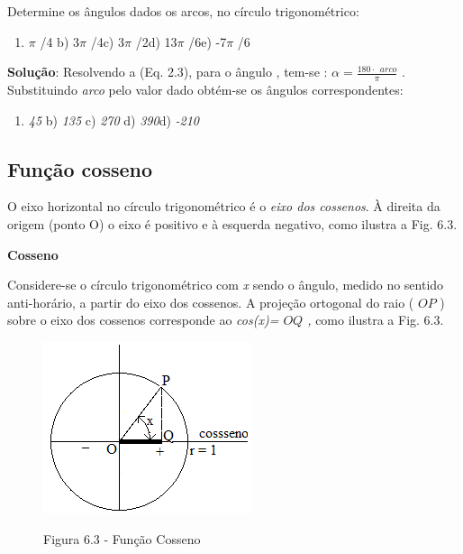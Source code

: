 \begin{texemplo}
Determine os ângulos dados os arcos, no círculo trigonométrico:

\begin{enumerate}
    \item $ \pi $ /4 \tab \tab b) 3$ \pi $ /4\tab \tab c) 3$ \pi $ /2\tab     \tab  d) 13$ \pi $ /6\tab e) -7$ \pi $ /6
\end{enumerate}

\textbf{Solução}: Resolvendo a (Eq. 2.3), para o ângulo , tem-se :   \(  \alpha =\frac{180 \cdot ~~arco  }{ \pi } \)  . Substituindo \textit{arco} pelo valor dado obtém-se os ângulos correspondentes:

\begin{enumerate}
    \item \textit{45\degree} \tab \tab b) \textit{135\degree } \tab c) \textit{270\degree}     \tab  d) \textit{390\degree  \tab }d) \textit{-210\degree  }\qedsymbol
\end{enumerate}
\end{texemplo}

\subsection{Função cosseno}

O eixo horizontal no círculo trigonométrico é o \textit{eixo dos cossenos}. À direita da origem (ponto O) o eixo é positivo e à esquerda negativo, como ilustra a Fig. 6.3.

\begin{caixa}
\textbf{Cosseno}

Considere-se o círculo trigonométrico com \textit{x} sendo o ângulo, medido no sentido anti-horário, a partir do eixo dos cossenos. A projeção ortogonal do raio ( \( OP \) ) sobre o eixo dos cossenos corresponde ao \textit{cos(x)= \(  OQ \) , }como ilustra a Fig. 6.3.
\end{caixa}

\begin{figure}[H]
    \begin{Center}
        \includegraphics[width=2.42in,height=1.98in]{capitulos/trigonometria_e_funcoes_trigonometricas/media/image29.png}
        
        Figura 6.3 - Função Cosseno
    \end{Center}
\end{figure}

